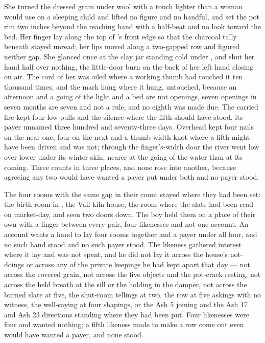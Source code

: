 She turned the dressed grain under wool with a touch lighter than a woman would use on a sleeping child and lifted no figure and no handful, and set the pot rim two inches beyond the reaching hand with a half-beat and no look toward the bed. Her finger lay along the top of 's front edge so that the charcoal tally beneath stayed unread; her lips moved along a two-gapped row and figured neither gap. She glanced once at the clay jar standing cold under , and shut her hand half over nothing, the little-door burn on the back of her left hand closing on air. The cord of her  was oiled where a working thumb had touched it ten thousand times, and the mark hung where it hung, untouched, because an afternoon and a going of the light and a bed are not openings, seven openings in seven months are seven and not a rule, and no eighth was made due. The carried fire kept four low pulls and the silence where the fifth should have stood, its payer unnamed three hundred and seventy-three days. Overhead  kept four nails on the near one, four on the next and a thumb-width knot where a fifth might have been driven and was not; through the finger's-width door the river went low over lower under its winter skin, nearer at the going of the water than at its coming. Three counts in three places, and none rose into another, because agreeing any two would have wanted a payer put under both and no payer stood.

The four rooms with the same gap in their count stayed where they had been set: the birth room in , the Vail kiln-house, the room where the slate had been read on market-day, and  seen two doors down. The boy held them on a place of their own with a finger between every pair, four likenesses and not one account. An account wants a hand to lay four rooms together and a payer under all four, and no such hand stood and no such payer stood. The likeness gathered interest where it lay and was not spent, and he did not lay it across the house's not-doings or across any of the private keepings he had kept apart that day — not across the covered grain, not across the five objects and the pot-crack resting, not across the held breath at the sill or the holding in the damper, not across the burned slate at five, the shut-room tellings at two, the row at five askings with no witness, the well-saying at four shapings, or the Ash 5 joining and the Ash 17 and Ash 23 directions standing where they had been put. Four likenesses were four and wanted nothing; a fifth likeness made to make a row come out even would have wanted a payer, and none stood.

